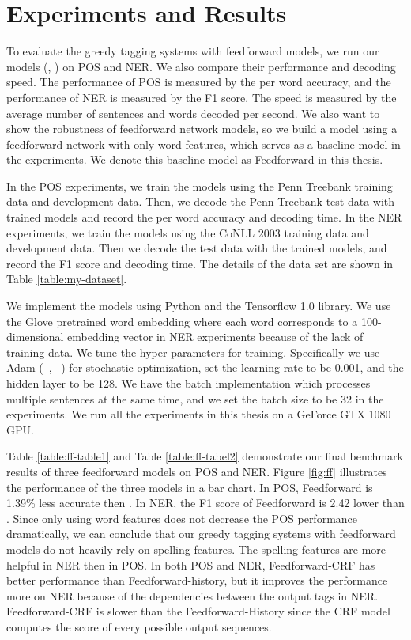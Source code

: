 \section{Experiments and Results}
To evaluate the greedy tagging systems with feedforward models, we run our models (\ffa, \ffb) on POS and NER. We also compare their performance and decoding speed. The performance of POS is measured by the per word accuracy, and the performance of NER is measured by the F1 score. The speed is measured by the average number of sentences and words decoded per second. We also want to show the robustness of feedforward network models, so we build a model using a feedforward network with only word features, which serves as a baseline model in the experiments. We denote this baseline model as Feedforward in this thesis.

In the POS experiments, we train the models using the Penn Treebank training data and development data. Then, we decode the Penn Treebank test data with trained models and record the per word accuracy and decoding time. In the NER experiments, we train the models using the CoNLL 2003 training data and development data. Then we decode the test data with the trained models, and record the F1 score and decoding time. The details of the data set are shown in Table \ref{table:my-dataset}.

 
We implement the models using Python and the Tensorflow 1.0 library. We use the Glove pretrained word embedding where each word corresponds to a 100-dimensional embedding vector in NER experiments because of the lack of training data. We tune the hyper-parameters for training. Specifically we use Adam (~\citeauthor{kingma2014adam}, ~\citeyear{kingma2014adam}) for stochastic optimization, set the learning rate to be 0.001, and the hidden layer to be 128. We have the batch implementation which processes multiple sentences at the same time, and we set the batch size to be 32 in the experiments. We run all the experiments in this thesis on a GeForce GTX 1080 GPU. 

Table \ref{table:ff-table1} and Table \ref{table:ff-tabel2} demonstrate our final benchmark results of three feedforward models on POS and NER. Figure \ref{fig:ff} illustrates the performance of the three models in a bar chart. In POS, Feedforward is 1.39\% less accurate then \ffa. In NER, the F1 score of Feedforward is 2.42 lower than \ffa. Since only using word features does not decrease the POS performance dramatically, we can conclude that our greedy tagging systems with feedforward models do not heavily rely on spelling features. The spelling features are more helpful in NER then in POS. In both POS and NER, Feedforward-CRF has better performance than Feedforward-history, but it improves the performance more on NER because of the dependencies between the output tags in NER. Feedforward-CRF is slower than the Feedforward-History since the CRF model computes the score of every possible output sequences.

